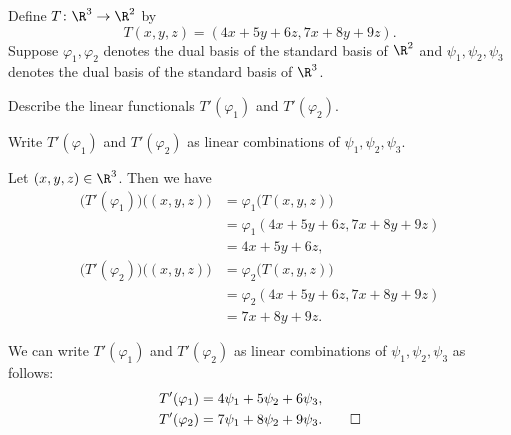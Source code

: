 \begin{exc}
\begin{exercise}
Define $T\colon\R^3\to\R^2$ by
\[ T(x,y,z) = (4x+5y+6z,7x+8y+9z). \]
Suppose $\varphi_1,\varphi_2$ denotes the dual basis of the standard basis of
$\R^2$ and $\psi_1,\psi_2,\psi_3$ denotes the dual basis of the standard basis
of $\R^3$.
\begin{parts}
\item Describe the linear functionals $T'(\varphi_1)$ and $T'(\varphi_2)$.
\item Write $T'(\varphi_1)$ and $T'(\varphi_2)$ as linear combinations of
  $\psi_1,\psi_2,\psi_3$.
\end{parts}
\end{exercise}
\begin{solution}\leavevmode
\begin{parts}
\item Let $(x,y,z)\in\R^3$. Then we have
  \begin{align*}
  \bigl(T'(\varphi_1)\bigr)\bigl((x,y,z)\bigr)
   &= \varphi_1\bigl(T(x,y,z)\bigr)\\
   &= \varphi_1(4x+5y+6z,7x+8y+9z)\\
   &= 4x+5y+6z,\\
  \bigl(T'(\varphi_2)\bigr)\bigl((x,y,z)\bigr)
   &= \varphi_2\bigl(T(x,y,z)\bigr)\\
   &= \varphi_2(4x+5y+6z,7x+8y+9z)\\
   &= 7x+8y+9z.
  \end{align*}
\item We can write $T'(\varphi_1)$ and $T'(\varphi_2)$ as linear combinations
  of $\psi_1,\psi_2,\psi_3$ as follows:
  \begin{align*}
  T'(\varphi_1) &= 4\psi_1+5\psi_2+6\psi_3,\\
  T'(\varphi_2) &= 7\psi_1+8\psi_2+9\psi_3. \qedhere
  \end{align*}
\end{parts}
\end{solution}


\end{exc}
